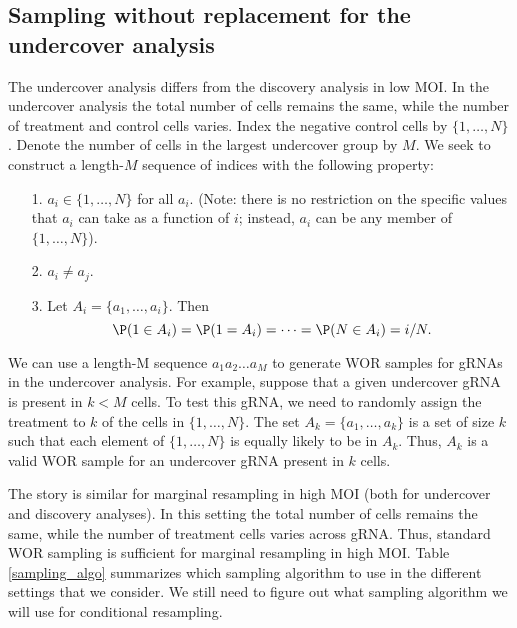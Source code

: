 \documentclass[12pt]{article}
\begin{document}
\subsection*{Sampling without replacement for the undercover analysis}

The undercover analysis differs from the discovery analysis in low MOI. In the undercover analysis the total number of cells remains the same, while the number of treatment and control cells varies. Index the negative control cells by $\{1, \dots, N\}$. Denote the number of cells in the largest undercover group by $M$. We seek to construct a length-$M$ sequence of indices with the following property:

\begin{itemize}
\item[1.] $a_i \in \{1, \dots, N\}$ for all $a_i$. (Note: there is no restriction on the specific values that $a_i$ can take as a function of $i$; instead, $a_i$ can be any member of $ \{1, \dots, N \}$).
\item[2.] $a_i \neq a_j$.
\item[3.] Let $A_i = \{ a_1, \dots, a_i \}.$ Then
$$ \P( 1 \in A_i ) = \P(1 = A_i) = \dots = \P(N \in A_i ) = i/N.$$
\end{itemize}

We can use a length-M sequence $a_1 a_2 \dots a_M$ to generate WOR samples for gRNAs in the undercover analysis. For example, suppose that a given undercover gRNA is present in $k < M$ cells. To test this gRNA, we need to randomly assign the treatment to $k$ of the cells in $\{ 1, \dots, N \}$. The set $A_k = \{a_1, \dots, a_k\}$ is a set of size $k$ such that each element of $\{1, \dots, N\}$ is equally likely to be in $A_k$. Thus, $A_k$ is a valid WOR sample for an undercover gRNA present in $k$ cells.

The story is similar for marginal resampling in high MOI (both for undercover and discovery analyses). In this setting the total number of cells remains the same, while the number of treatment cells varies across gRNA. Thus, standard WOR sampling is sufficient for marginal resampling in high MOI. Table \ref{sampling_algo} summarizes which sampling algorithm to use in the different settings that we consider. We still need to figure out what sampling algorithm we will use for conditional resampling.
\end{document}
